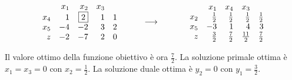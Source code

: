 \documentclass[10pt]{article}
\begin{document}
\[
   \begin{array}{rrrrr}
         & x_1  & x_2 & x_3  \\
      x_4 & 1  & \fbox{$2$} &  1  & 1  \\
      x_5 & -4 &  -2  &  3  & 2 \\
       z  & -2 &  -7  &  2  & 0 \\
   \end{array}
\hfill
\hspace{1cm}
{\longrightarrow}
\hfill
\hspace{1.2cm}
   \begin{array}{rrrrr}
         & x_1  & x_4 & x_3  \\
      x_2 &  \frac{1}{2} &  \frac{1}{2}  & \frac{1}{2}  &  \frac{1}{2} \\
      x_5 &  -3 &  1  &  4  &  3 \\
       z  & \frac{3}{2} & \frac{7}{2} & \frac{11}{2}  & \frac{7}{2} \\
   \end{array}
\]

Il valore ottimo della funzione obiettivo \`e ora $\frac{7}{2}$.
La soluzione primale ottima \`e $x_1=x_3 = 0$
con $x_2=\frac{1}{2}$.
La soluzione duale ottima \`e 
$y_2 = 0$
con $y_1 = \frac{3}{2}$.\\
\end{document}
